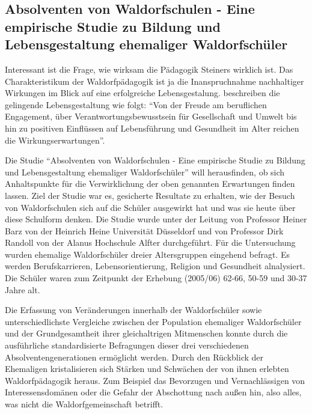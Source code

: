 
\subsection{Absolventen von Waldorfschulen - Eine empirische Studie zu Bildung und Lebensgestaltung ehemaliger Waldorfschüler} %
\label{Studie}

Interessant ist die Frage, wie wirksam die Pädagogik Steiners wirklich ist. Das Charakteristikum der Waldorfpädagogik ist ja die Inanspruchnahme nachhaltiger Wirkungen im Blick auf eine erfolgreiche Lebensgestalung. \citet[][S. 13]{randoll07} beschreiben die gelingende Lebensgestaltung wie folgt: \enquote{Von der Freude am beruflichen Engagement, über Verantwortungsbewusstsein für Gesellschaft und Umwelt bis hin zu positiven Einflüssen auf Lebensführung und Gesundheit im Alter reichen die Wirkungserwartungen}.

Die Studie \enquote{Absolventen von Waldorfschulen - Eine empirische Studie zu Bildung und Lebensgestaltung ehemaliger Waldorfschüler} will herausfinden, ob sich Anhaltspunkte für die Verwirklichung der oben genannten Erwartungen finden lassen. Ziel der Studie war es, gesicherte Resultate zu erhalten, wie der Besuch von Waldorfschulen sich auf die Schüler ausgewirkt hat und was sie heute über diese Schulform denken. Die Studie wurde unter der Leitung von Professor Heiner Barz von der Heinrich Heine Universität Düsseldorf und von Professor Dirk Randoll von der Alanus Hochschule Alfter durchgeführt. Für die Untersuchung wurden ehemalige Waldorfschüler dreier Altersgruppen eingehend befragt. Es werden Berufskarrieren, Lebensorientierung, Religion und Gesundheit alnalysiert. Die Schüler waren zum Zeitpunkt der Erhebung (2005/06) 62-66, 50-59 und 30-37 Jahre alt.   \citep[Vgl.][]{randoll07, paschen10}

Die Erfassung von Veränderungen innerhalb der Waldorfschüler sowie unterschiedlichste Vergleiche zwischen der Population ehemaliger Waldorfschüler und der Grundgesamtheit ihrer gleichaltrigen Mitmenschen konnte durch die ausführliche standardisierte Befragungen dieser drei verschiedenen Absolventengenerationen ermöglicht werden. Durch den Rückblick der Ehemaligen kristalisieren sich Stärken und Schwächen der von ihnen erlebten Waldorfpädagogik heraus. Zum Beispiel das Bevorzugen und Vernachlässigen von Interessensdomänen oder die Gefahr der Abschottung nach außen hin, also alles, was nicht die Waldorfgemeinschaft betrifft.  \citep[Vgl.][S. 12]{randoll07}

